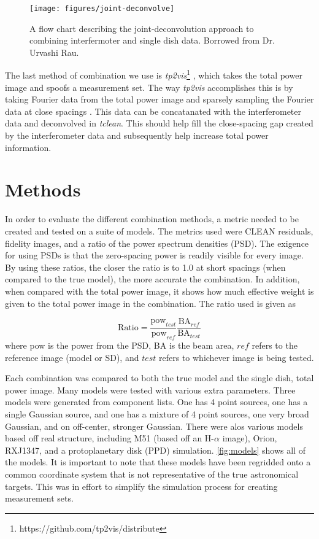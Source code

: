 \documentclass[manuscript,linenumbers]{aastex62}
\begin{document}
\begin{figure*}[t]
    \texttt{[image: figures/joint-deconvolve]}
    \caption{A flow chart describing the joint-deconvolution approach to combining interfermoter and single dish data. Borrowed from Dr. Urvashi Rau.}
    \label{fig:jd-flow}
\end{figure*}

The last method of combination we use is \textit{tp2vis}\footnote{https://github.com/tp2vis/distribute} , which takes the total power image and spoofs a measurement set. The way \textit{tp2vis} accomplishes this is by taking Fourier data from the total power image and sparsely sampling the Fourier data at close spacings \citep[see][]{2011ApJS..193...19K}. This data can be concatanated with the interferometer data and deconvolved in \textit{tclean}. This should help fill the close-spacing gap created by the interferometer data and subsequently help increase total power information.

\section{Methods}

In order to evaluate the different combination methods, a metric needed to be created and tested on a suite of models. The metrics used were CLEAN residuals, fidelity images, and a ratio of the power spectrum densities (PSD). The exigence for using PSDs is that the zero-spacing power is readily visible for every image. By using these ratios, the closer the ratio is to 1.0 at short spacings (when compared to the true model), the more accurate the combination. In addition, when compared with the total power image, it shows how much effective weight is given to the total power image in the combination. The ratio used is given as

\begin{equation}
    \text{Ratio} = \frac{\text{pow}_{test}}{\text{pow}_{ref}} \frac{\text{BA}_{ref}}{\text{BA}_{test}}
    \label{eqn:ratio}
\end{equation} 
where pow is the power from the PSD, BA is the beam area, $ref$ refers to the reference image (model or SD), and $test$ refers to whichever image is being tested.

Each combination was compared to both the true model and the single dish, total power image. Many models were tested with various extra parameters. Three models were generated from component lists. One has 4 point sources, one has a single Gaussian source, and one has a mixture of 4 point sources, one very broad Gaussian, and on off-center, stronger Gaussian. There were alos various models based off real structure, including M51 (based off an H-$\alpha$ image), Orion, RXJ1347, and a protoplanetary disk (PPD) simulation. \autoref{fig:models} shows all of the models. It is important to note that these models have been regridded onto a common coordinate system that is not representative of the true astronomical targets. This was in effort to simplify the simulation process for creating measurement sets. 
\end{document}
